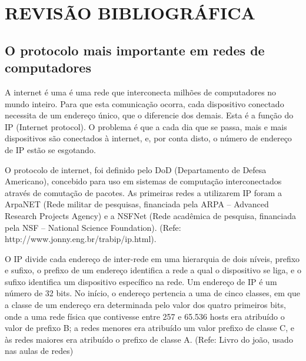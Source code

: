 \chapter{REVISÃO BIBLIOGRÁFICA}\label{ch:rev-bibs}

\section{O protocolo mais importante em redes de computadores}\label{sec:protIP}
A internet é uma é uma rede que interconecta milhões de computadores no mundo inteiro. Para que esta comunicação ocorra, cada dispositivo conectado necessita de um endereço único, que o diferencie dos demais. Esta é a função do IP (Internet protocol). O problema é que a cada dia que se passa, mais e mais dispositivos são conectados à internet, e, por conta disto, o número de endereço de IP estão se esgotando. 

O protocolo de internet, foi definido pelo DoD (Departamento de Defesa Americano), concebido para uso em sistemas de computação interconectados através de comutação de pacotes. As primeiras redes a utilizarem IP foram a ArpaNET (Rede militar de pesquisas, financiada pela ARPA – Advanced Research Projects Agency) e a NSFNet (Rede acadêmica de pesquisa, financiada pela NSF – National Science Foundation). (Refe: http://www.jonny.eng.br/trabip/ip.html).

O IP divide cada endereço de inter-rede em uma hierarquia de dois níveis, prefixo e sufixo, o prefixo de um endereço identifica a rede a qual o dispositivo se liga, e o sufixo identifica um dispositivo específico na rede. Um endereço de IP é um número de 32 bits. No início, o endereço pertencia a uma de cinco classes, em que a classe de um endereço era determinada pelo valor dos quatro primeiros bits, onde a uma rede física que contivesse entre 257 e 65.536 hosts era atribuído o valor de prefixo B; a redes menores era atribuído um valor prefixo de classe C, e às redes maiores era atribuído o prefixo de classe A. (Refe: Livro do joão, usado nas aulas de redes)

